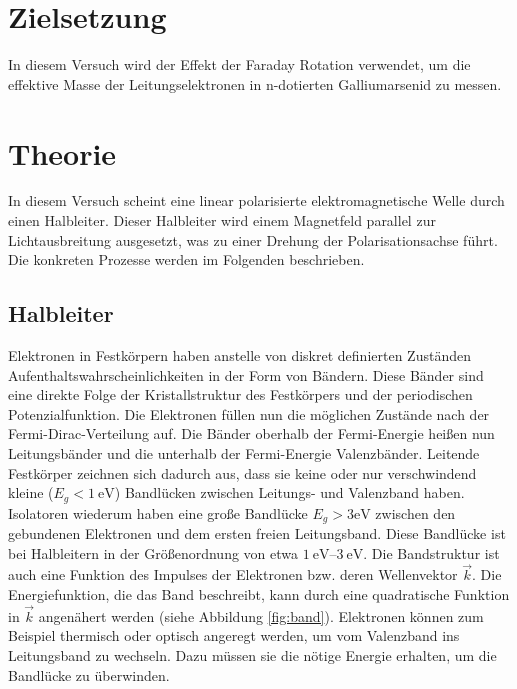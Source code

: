 \section{Zielsetzung}
In diesem Versuch wird der Effekt der Faraday Rotation verwendet, um die
effektive Masse der Leitungselektronen in n-dotierten Galliumarsenid zu messen.

\section{Theorie}
In diesem Versuch scheint eine linear polarisierte elektromagnetische Welle
durch einen Halbleiter. Dieser Halbleiter wird einem Magnetfeld parallel zur
Lichtausbreitung ausgesetzt, was zu einer Drehung der Polarisationsachse führt.
Die konkreten Prozesse werden im Folgenden beschrieben.

\subsection{Halbleiter \cite[][Kap. 13, 14]{book:expi3}}

Elektronen in Festkörpern haben anstelle von diskret definierten Zuständen
Aufenthaltswahrscheinlichkeiten in der Form von Bändern. Diese Bänder sind eine
direkte Folge der Kristallstruktur des Festkörpers und der periodischen
Potenzialfunktion.
Die Elektronen füllen nun die möglichen Zustände nach der
Fermi-Dirac-Verteilung auf. Die Bänder oberhalb der Fermi-Energie heißen nun
Leitungsbänder und die unterhalb der Fermi-Energie Valenzbänder. Leitende
Festkörper zeichnen sich dadurch aus, dass sie keine oder nur verschwindend
kleine ($E_g < \qty{1}{\eV}$\cite{web:Bandlücke}) Bandlücken zwischen Leitungs-
und Valenzband haben. Isolatoren wiederum haben eine große Bandlücke $E_g > 3
	\unit{\eV}$ \cite{web:Bandlücke} zwischen den gebundenen Elektronen und dem
ersten freien Leitungsband. Diese Bandlücke ist bei Halbleitern in der
Größenordnung von etwa $\qtyrange{1}{3}{\eV}$\cite{web:Bandlücke}. Die
Bandstruktur ist auch eine Funktion des Impulses der Elektronen bzw. deren
Wellenvektor $\vec{k}$. Die Energiefunktion, die das Band beschreibt, kann
durch eine quadratische Funktion in $\vec{k}$ angenähert werden (siehe
Abbildung \ref{fig:band}). Elektronen können zum Beispiel thermisch oder
optisch angeregt werden, um vom Valenzband ins Leitungsband zu wechseln. Dazu
müssen sie die nötige Energie erhalten, um die Bandlücke zu überwinden.


